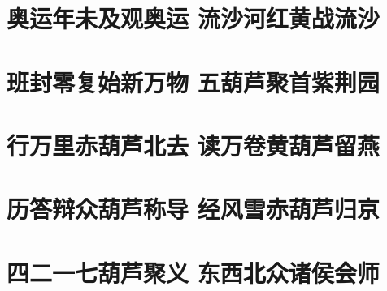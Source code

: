 \documentclass[12pt, a4paper]{book}
\begin{document}
\begin{CJK}{UTF8}{gbsn}
    \chapter{奥运年未及观奥运 流沙河红黄战流沙}

    \chapter{班封零复始新万物 五葫芦聚首紫荆园}

    \chapter{行万里赤葫芦北去 读万卷黄葫芦留燕}

    \chapter{历答辩众葫芦称导 经风雪赤葫芦归京}

    \chapter{四二一七葫芦聚义 东西北众诸侯会师}

    \appendix

    
    
\end{CJK}
\end{document}
